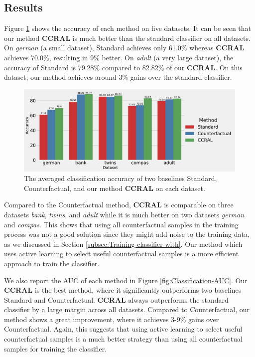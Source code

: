 \subsection{Results}

Figure \ref{fig:Classification-accuracy} shows the accuracy of each
method on five datasets. It can be seen that our method \textbf{CCRAL}
is much better than the standard classifier on all datasets. On \textit{german}
(a small dataset), Standard achieves only 61.0\% whereas \textbf{CCRAL}
achieves 70.0\%, resulting in 9\% better. On \textit{adult} (a very
large dataset), the accuracy of Standard is 79.28\% compared to 82.82\%
of our \textbf{CCRAL}. On this dataset, our method achieves around
3\% gains over the standard classifier.

\begin{figure}
\centering{}\includegraphics[scale=0.35]{figs/_plot_svm_accuracy}\caption{\label{fig:Classification-accuracy}The averaged classification accuracy
of two baselines Standard, Counterfactual, and our method \textbf{CCRAL}
on each dataset.}
\end{figure}
Compared to the Counterfactual method, \textbf{CCRAL} is comparable
on three datasets \textit{bank}, \textit{twins}, and \textit{adult}
while it is much better on two datasets \textit{german} and \textit{compas}.
This shows that using all counterfactual samples in the training process
was not a good solution since they might add noise to the training
data, as we discussed in Section \ref{subsec:Training-classifier-with}.
Our method which uses active learning to select useful counterfactual
samples is a more efficient approach to train the classifier.

We also report the AUC of each method in Figure \ref{fig:Classification-AUC}.
Our \textbf{CCRAL} is the best method, where it significantly outperforms
two baselines Standard and Counterfactual. \textbf{CCRAL} always outperforms
the standard classifier by a large margin across all datasets. Compared
to Counterfactual, our method shows a great improvement, where it
achieves 3-9\% gains over Counterfactual. Again, this suggests that
using active learning to select useful counterfactual samples is a
much better strategy than using all counterfactual samples for training
the classifier.

